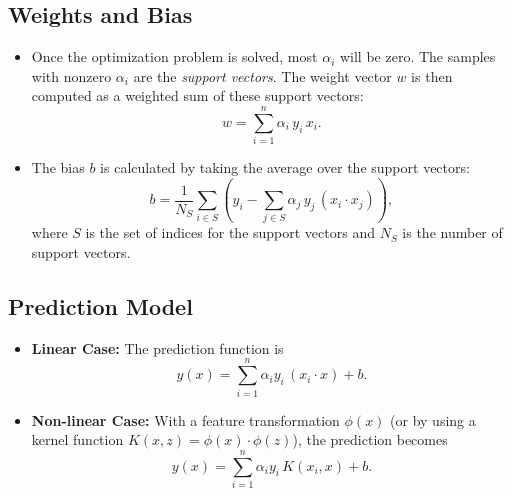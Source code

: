 \documentclass[10pt]{article}
\begin{document}
\subsection{Weights and Bias}
\begin{itemize}
    \item Once the optimization problem is solved, most \(\alpha_i\) will be zero. The samples with nonzero \(\alpha_i\) are the        \emph{support vectors}. The weight vector \(w\) is then computed as a weighted sum of these support vectors:
    \[
    w = \sum_{i=1}^{n} \alpha_i \, y_i \, x_i.
    \]
    \item The bias \(b\) is calculated by taking the average over the support vectors:
    \[
    b = \frac{1}{N_S} \sum_{i \in S} \left( y_i - \sum_{j \in S} \alpha_j \, y_j \, (x_i \cdot x_j) \right),
    \]
    where \(S\) is the set of indices for the support vectors and \(N_S\) is the number of support vectors.
\end{itemize}

\subsection{Prediction Model}
\begin{itemize}
    \item \textbf{Linear Case:} The prediction function is
    \[
    y(x) = \sum_{i=1}^{n} \alpha_i y_i \, (x_i \cdot x) + b.
    \]
    \item \textbf{Non-linear Case:} With a feature transformation \(\phi(x)\) (or by using a kernel function \(K(x,z)=\phi(x)\cdot \phi(z)\)), the prediction becomes
    \[
    y(x) = \sum_{i=1}^{n} \alpha_i y_i \, K(x_i,x) + b.
    \]
\end{itemize}
\end{document}
